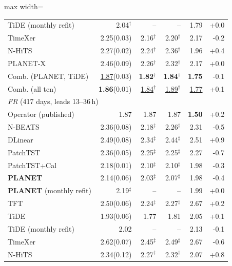 \begin{table}[!t]
\begin{adjustbox}{max width=\linewidth}
\begin{tabular}{lrrrrr}
\quad TiDE (monthly refit) & 2.04$^{\dagger}$ & -- & -- & 1.79 & +0.0 \\
\quad TimeXer & 2.25{\scriptsize\color{gray}(0.03)} & 2.16$^{\dagger}$ & 2.20$^{\dagger}$ & 2.17 & -0.2 \\
\quad N-HiTS & 2.27{\scriptsize\color{gray}(0.02)} & 2.24$^{\dagger}$ & 2.36$^{\dagger}$ & 1.96 & +0.4 \\
\quad PLANET-X & 2.46{\scriptsize\color{gray}(0.09)} & 2.26$^{\dagger}$ & 2.32$^{\dagger}$ & 2.17 & +0.0 \\
\quad Comb. (PLANET, TiDE) & \underline{1.87}{\scriptsize\color{gray}(0.03)} & \textbf{1.82}$^{\dagger}$ & \textbf{1.84}$^{\dagger}$ & \textbf{1.75} & -0.1 \\
\quad Comb. (all ten) & \textbf{1.86}{\scriptsize\color{gray}(0.01)} & \underline{1.84}$^{\dagger}$ & \underline{1.89}$^{\dagger}$ & \underline{1.77} & +0.1 \\
\midrule
\multicolumn{6}{l}{\textit{FR} (417 days, leads 13--36\,h)} \\
\quad Operator (published) & 1.87 & 1.87 & 1.87 & \textbf{1.50} & +0.2 \\
\quad N-BEATS & 2.36{\scriptsize\color{gray}(0.08)} & 2.18$^{\ddagger}$ & 2.26$^{\ddagger}$ & 2.31 & -0.5 \\
\quad DLinear & 2.49{\scriptsize\color{gray}(0.08)} & 2.34$^{\ddagger}$ & 2.44$^{\ddagger}$ & 2.51 & +0.9 \\
\quad PatchTST & 2.36{\scriptsize\color{gray}(0.05)} & 2.25$^{\ddagger}$ & 2.25$^{\ddagger}$ & 2.27 & -0.7 \\
\quad PatchTST+Cal & 2.18{\scriptsize\color{gray}(0.01)} & 2.10$^{\ddagger}$ & 2.10$^{\ddagger}$ & 1.98 & -0.3 \\
\quad \textbf{PLANET} & 2.14{\scriptsize\color{gray}(0.06)} & 2.03$^{\ddagger}$ & 2.07$^{\ddagger}$ & 1.98 & -0.4 \\
\quad \textbf{PLANET} (monthly refit) & 2.19$^{\ddagger}$ & -- & -- & 1.99 & +0.0 \\
\quad TFT & 2.50{\scriptsize\color{gray}(0.06)} & 2.24$^{\ddagger}$ & 2.27$^{\ddagger}$ & 2.67 & +0.2 \\
\quad TiDE & 1.93{\scriptsize\color{gray}(0.06)} & 1.77 & 1.81 & 2.05 & +0.1 \\
\quad TiDE (monthly refit) & 2.02 & -- & -- & 2.13 & -0.1 \\
\quad TimeXer & 2.62{\scriptsize\color{gray}(0.07)} & 2.45$^{\ddagger}$ & 2.49$^{\ddagger}$ & 2.67 & -0.6 \\
\quad N-HiTS & 2.34{\scriptsize\color{gray}(0.12)} & 2.27$^{\ddagger}$ & 2.32$^{\ddagger}$ & 2.07 & +0.8 \\

\end{tabular}
\end{adjustbox}
\end{table}
